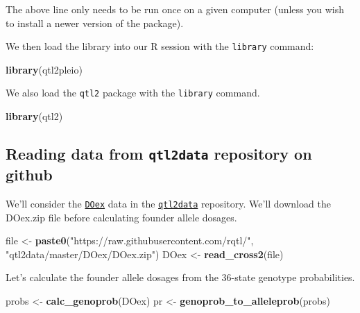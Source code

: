 \documentclass[oneside]{book}\usepackage[]{graphicx}\usepackage[]{color}
\newenvironment{Shaded}{\begin{snugshade}}{\end{snugshade}}
\newcommand{\KeywordTok}[1]{\textcolor[rgb]{0.13,0.29,0.53}{\textbf{#1}}}
\newcommand{\NormalTok}[1]{#1}
\newcommand{\StringTok}[1]{\textcolor[rgb]{0.31,0.60,0.02}{#1}}
\begin{document}
The above line only needs to be run once on a given computer (unless you
wish to install a newer version of the package).

We then load the library into our R session with the \texttt{library}
command:

\begin{Shaded}
\begin{Highlighting}[]
\KeywordTok{library}\NormalTok{(qtl2pleio)}
\end{Highlighting}
\end{Shaded}

We also load the \texttt{qtl2} package with the \texttt{library}
command.

\begin{Shaded}
\begin{Highlighting}[]
\KeywordTok{library}\NormalTok{(qtl2)}
\end{Highlighting}
\end{Shaded}

\hypertarget{reading-data-from-qtl2data-repository-on-github}{%
\subsection{\texorpdfstring{Reading data from \texttt{qtl2data}
repository on
github}{Reading data from qtl2data repository on github}}\label{reading-data-from-qtl2data-repository-on-github}}

We'll consider the
\href{https://github.com/rqtl/qtl2data/tree/master/DOex}{\texttt{DOex}}
data in the \href{https://github.com/rqtl/qtl2data}{\texttt{qtl2data}}
repository. We'll download the DOex.zip file before calculating founder
allele dosages.

\begin{Shaded}
\begin{Highlighting}[]
\NormalTok{file <-}\StringTok{ }\KeywordTok{paste0}\NormalTok{(}\StringTok{"https://raw.githubusercontent.com/rqtl/"}\NormalTok{, }\StringTok{"qtl2data/master/DOex/DOex.zip"}\NormalTok{)}
\NormalTok{DOex <-}\StringTok{ }\KeywordTok{read_cross2}\NormalTok{(file)}
\end{Highlighting}
\end{Shaded}

Let's calculate the founder allele dosages from the 36-state genotype
probabilities.

\begin{Shaded}
\begin{Highlighting}[]
\NormalTok{probs <-}\StringTok{ }\KeywordTok{calc_genoprob}\NormalTok{(DOex)}
\NormalTok{pr <-}\StringTok{ }\KeywordTok{genoprob_to_alleleprob}\NormalTok{(probs)}
\end{Highlighting}
\end{Shaded}
\end{document}
